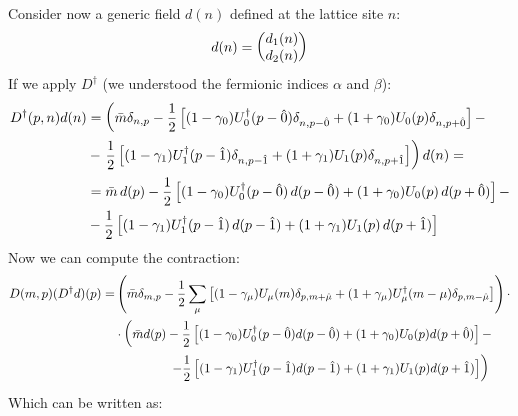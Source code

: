 \\ Consider now a generic field $d(n)$ defined at the lattice site $n$:
\begin{equation*}
    d(n) = \mqty(d_1(n) \\ d_2(n))
\end{equation*}
If we apply $D^\dagger$ (we understood the fermionic indices $\alpha$ and $\beta$):
\begin{equation}\label{ddagger d}
\begin{split}
        D^\dagger(p,n) d(n) & = \left( \Bar{m} \delta_{n, p} - \frac{1}{2}\left[(1-\gamma_0) U_0^\dagger( p - \hat{0})\delta_{n, p - \hat{0}} + (1 + \gamma_0) U_0 (p) \delta_{n, p + \hat{0}} \right]  - \right. \\ 
        & - \left. \frac{1}{2}\left[(1-\gamma_1) U_1^\dagger(p - \hat{1})\delta_{n, p - \hat{1}} + (1 + \gamma_1) U_1 (p) \delta_{n, p + \hat{1}} \right]   \right) d(n) = \\
        & = \Bar{m}\,d(p) - \frac{1}{2}\left[ (1 - \gamma_0) U_0^\dagger(p - \hat{0})\,d(p-\hat{0}) + (1 + \gamma_0) U_0 (p)\,d(p+\hat{0}) \right] - \\
        & - \frac{1}{2}\left[ (1 - \gamma_1) U_1^\dagger(p - \hat{1})\,d(p-\hat{1}) + (1 + \gamma_1) U_1 (p)\,d(p+\hat{1}) \right]
\end{split}
\end{equation}
Now we can compute the contraction:
\begin{equation*}
    \begin{split}
        D(m, p)(D^\dagger d)(p) =& \left(\Bar{m} \delta_{m,p} - \frac{1}{2}\sum_{\mu} \left[ (1 - \gamma_\mu) U_\mu(m) \delta_{p, m + \hat{\mu}} + (1 + \gamma_\mu) U_\mu^\dagger (m - \mu) \delta_{p, m - \hat{\mu}} \right]\right) \cdot \\
        & \cdot \left( \Bar{m} d(p) - \frac{1}{2}\left[ (1 - \gamma_0) U_0^\dagger(p - \hat{0}) d(p-\hat{0}) + (1 + \gamma_0) U_0 (p) d(p+\hat{0}) \right] - \right. \\ 
        & \hspace{15 mm} \left. - \frac{1}{2}\left[ (1 - \gamma_1) U_1^\dagger(p - \hat{1}) d(p-\hat{1}) + (1 + \gamma_1) U_1 (p) d(p+\hat{1}) \right] \right)
    \end{split}
\end{equation*}
Which can be written as:
